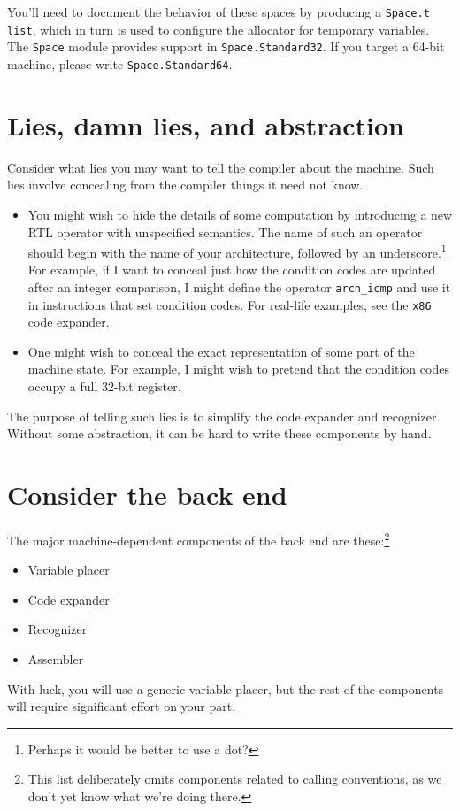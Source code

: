 \documentclass[12pt]{article}
\begin{document}
You'll need to document the behavior of these spaces by producing a
\texttt{Space.t list}, which in turn is used to configure the
allocator for temporary variables.
The \texttt{Space} module provides support in \texttt{Space.Standard32}.
If you target a 64-bit machine, please write \texttt{Space.Standard64}.


\section{Lies, damn lies, and abstraction}

Consider what lies you may want to tell the compiler about the
machine.
Such lies involve concealing from the compiler things it need not
know.
\begin{itemize}
\item
You might wish to hide the details of some computation by introducing
a new RTL operator with unspecified semantics.
The name of such an operator should begin with the name of your
architecture, followed by an underscore.\footnote
{Perhaps it would be better to use a dot?}
For example, if I want to conceal just how the condition codes are
updated after an integer comparison, I might define the operator
\texttt{arch\_icmp} and use it in instructions that set condition codes.
For real-life examples, see the \texttt{x86} code expander.
\item
One might wish to conceal the exact representation of some part of the
machine state.
For example, I might wish to pretend that the condition codes occupy a
full 32-bit register.
\end{itemize}
The purpose of telling such lies is to simplify the code expander and
recognizer.
Without some abstraction, it can be hard to write these components by
hand.

\section{Consider the back end}

The major machine-dependent components of the back end are
these:\footnote
{This list deliberately omits components related to calling
conventions, as we don't yet know what we're doing there.}
\begin{itemize}
\item
Variable placer
\item
Code expander
\item
Recognizer
\item
Assembler
\end{itemize}
With luck, you will use a generic variable placer, but the rest of the
components will require significant effort on your part.
\end{document}
